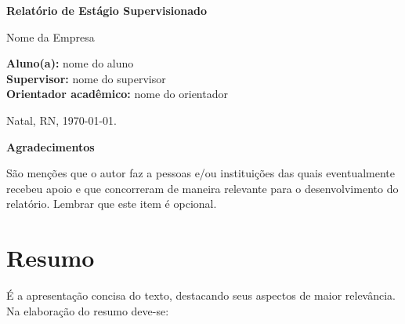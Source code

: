 \documentclass[a4paper, 12pt]{article}
\begin{document}
\vfill

\begin{center}
\LARGE{\bf Relatório de Estágio Supervisionado}

\Large{Nome da Empresa}
\end{center}

\normalsize
\vfill

\begin{flushleft}
{\bf Aluno(a):} nome do aluno \\
{\bf Supervisor:} nome do supervisor\\
{\bf Orientador acadêmico:} nome do orientador 
\end{flushleft}

\vfill

\begin{center}
Natal, RN, \today.
\end{center}

\newpage


\begin{center}
{\bf \Large Agradecimentos}
\end{center}

São menções que o autor faz a pessoas e/ou instituições das quais eventualmente recebeu apoio e que concorreram de maneira relevante para o desenvolvimento do relatório. Lembrar que este item é opcional.

\newpage

\tableofcontents

\newpage

\listoffigures
{}


\newpage

\listoftables
{}


\newpage

\section*{Resumo}

É a apresentação concisa do texto, destacando seus aspectos de maior relevância. Na elaboração do resumo deve-se:
\end{document}
